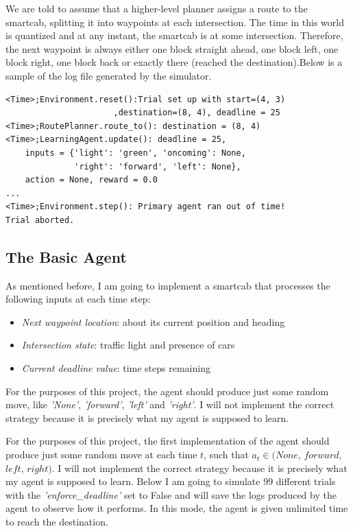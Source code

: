 \documentclass[a4paper]{article}
\begin{document}
We are told to assume that a higher-level planner assigns a route to the smartcab, splitting it into waypoints at each intersection. The time in this world is quantized and at any instant, the smartcab is at some intersection. Therefore, the next waypoint is always either one block straight ahead, one block left, one block right, one block back or exactly there (reached the destination).Below is a sample of the log file generated by the simulator.

\begin{lstlisting}
<Time>;Environment.reset():Trial set up with start=(4, 3)
                      ,destination=(8, 4), deadline = 25
<Time>;RoutePlanner.route_to(): destination = (8, 4)
<Time>;LearningAgent.update(): deadline = 25,
    inputs = {'light': 'green', 'oncoming': None,
              'right': 'forward', 'left': None},
    action = None, reward = 0.0
...
<Time>;Environment.step(): Primary agent ran out of time!
Trial aborted.
\end{lstlisting}

\subsection{The Basic Agent}
As mentioned before, I am going to implement a smartcab that processes the following inputs at each time step:

\begin{itemize}
\item \textit{Next waypoint location}: about its current position and heading
\item \textit{Intersection state}: traffic light and presence of cars
\item \textit{Current deadline value}: time steps remaining
\end{itemize}

For the purposes of this project, the agent should produce just some random move, like \textit{'None'}, \textit{'forward'}, \textit{'left'} and \textit{'right'}. I will not implement the correct strategy because it is precisely what my agent is supposed to learn.

For the purposes of this project, the first implementation of the agent should produce just some random move at each time $t$, such that $a_t \in (None,\, forward,\,$
$ left,\, right)$. I will not implement the correct strategy because it is precisely what my agent is supposed to learn. Below I am going to simulate $99$ different trials with the \textit{'enforce\_deadline'} set to False and will save the logs produced by the agent to observe how it performs. In this mode, the agent is given unlimited time to reach the destination.
\end{document}
